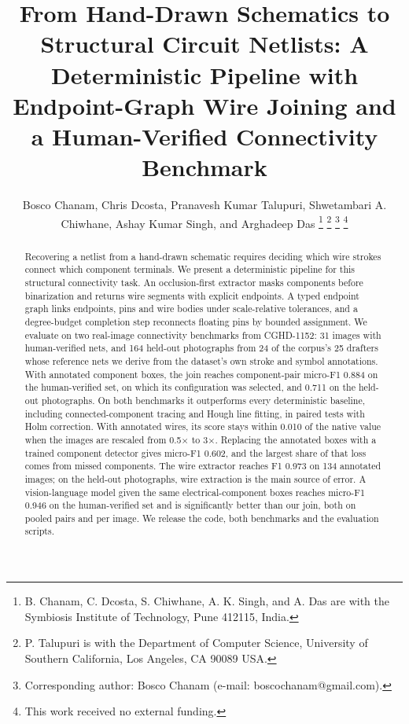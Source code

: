 \documentclass[journal]{IEEEtran}
\begin{document}
\title{From Hand-Drawn Schematics to Structural Circuit Netlists: A Deterministic Pipeline with Endpoint-Graph Wire Joining and a Human-Verified Connectivity Benchmark}

\author{Bosco Chanam, Chris Dcosta, Pranavesh Kumar Talupuri, Shwetambari A. Chiwhane, Ashay Kumar Singh, and Arghadeep Das%
\thanks{B. Chanam, C. Dcosta, S. Chiwhane, A. K. Singh, and A. Das are with the Symbiosis Institute of Technology, Pune 412115, India.}%
\thanks{P. Talupuri is with the Department of Computer Science, University of Southern California, Los Angeles, CA 90089 USA.}%
\thanks{Corresponding author: Bosco Chanam (e-mail: boscochanam@gmail.com).}%
\thanks{This work received no external funding.}}

\maketitle

\begin{abstract}
Recovering a netlist from a hand-drawn schematic requires deciding which wire strokes connect which component terminals. We present a deterministic pipeline for this structural connectivity task. An occlusion-first extractor masks components before binarization and returns wire segments with explicit endpoints. A typed endpoint graph links endpoints, pins and wire bodies under scale-relative tolerances, and a degree-budget completion step reconnects floating pins by bounded assignment. We evaluate on two real-image connectivity benchmarks from CGHD-1152: 31 images with human-verified nets, and 164 held-out photographs from 24 of the corpus's 25 drafters whose reference nets we derive from the dataset's own stroke and symbol annotations. With annotated component boxes, the join reaches component-pair micro-F1 0.884 on the human-verified set, on which its configuration was selected, and 0.711 on the held-out photographs. On both benchmarks it outperforms every deterministic baseline, including connected-component tracing and Hough line fitting, in paired tests with Holm correction. With annotated wires, its score stays within 0.010 of the native value when the images are rescaled from 0.5$\times$ to 3$\times$. Replacing the annotated boxes with a trained component detector gives micro-F1 0.602, and the largest share of that loss comes from missed components. The wire extractor reaches F1 0.973 on 134 annotated images; on the held-out photographs, wire extraction is the main source of error. A vision-language model given the same electrical-component boxes reaches micro-F1 0.946 on the human-verified set and is significantly better than our join, both on pooled pairs and per image. We release the code, both benchmarks and the evaluation scripts.
\end{abstract}
\end{document}
